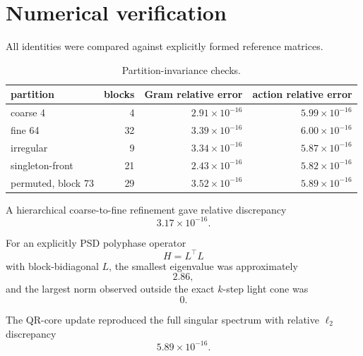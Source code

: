 \section{Numerical verification}\label{sec:final-28}

All identities were compared against explicitly formed reference matrices.

\begin{table}[htbp]
\centering
\caption{Partition-invariance checks.}
\begin{tabular}{lrrr}
\toprule
partition & blocks & Gram relative error & action relative error\\
\midrule
coarse 4 & 4 & \(2.91\times10^{-16}\) & \(5.99\times10^{-16}\)\\
fine 64 & 32 & \(3.39\times10^{-16}\) & \(6.00\times10^{-16}\)\\
irregular & 9 & \(3.34\times10^{-16}\) & \(5.87\times10^{-16}\)\\
singleton-front & 21 & \(2.43\times10^{-16}\) & \(5.82\times10^{-16}\)\\
permuted, block 73 & 29 & \(3.52\times10^{-16}\) & \(5.89\times10^{-16}\)\\
\bottomrule
\end{tabular}
\end{table}

A hierarchical coarse-to-fine refinement gave relative discrepancy
\[
3.17\times10^{-16}.
\]

For an explicitly PSD polyphase operator
\[
H=L^\top L
\]
with block-bidiagonal \(L\), the smallest eigenvalue was approximately
\[
2.86,
\]
and the largest norm observed outside the exact \(k\)-step light cone was
\[
\boxed{0}.
\]

The QR-core update reproduced the full singular spectrum with relative
\(\ell_2\) discrepancy
\[
5.89\times10^{-16}.
\]



